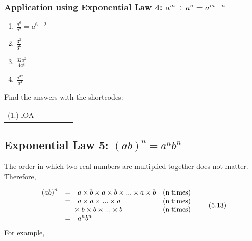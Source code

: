             \subsubsection{ Application using Exponential Law 4: ${a}^{m}÷{a}^{n}={a}^{m-n}$}
            \nopagebreak
        \label{m38359*id65493}\begin{enumerate}[noitemsep, label=\textbf{\arabic*}. ] 
            \label{m38359*uid25}\item 
            $\frac{{a}^{6}}{{a}^{2}}={a}^{6-2}$
      \label{m38359*uid26}\item 
        $\frac{{3}^{2}}{{3}^{6}}$
      \label{m38359*uid27}\item 
        $\frac{32{a}^{2}}{4{a}^{8}}$
      \label{m38359*uid28}\item 
        $\frac{{a}^{3x}}{{a}^{4}}$
\newline
\newline
          \end{enumerate}
      \label{m38359*uid29}
\par {} Find the answers with the shortcodes:
 \par \begin{tabular}[h]{cccccc}
 (1.) lOA  & \end{tabular}
            \subsection{ Exponential Law 5: ${\left(ab\right)}^{n}={a}^{n}{b}^{n}$}
            \nopagebreak
        \label{m38359*id65819}The order in which two real numbers are multiplied together does not matter. Therefore,\par 
        \label{m38359*uid30}\nopagebreak\noindent{}
    \begin{equation}
    \begin{array}{cccc}\hfill {\left(ab\right)}^{n}& =& a\ensuremath{\times}b\ensuremath{\times}a\ensuremath{\times}b\ensuremath{\times}...\ensuremath{\times}a\ensuremath{\times}b\hfill & \left(\mathrm{n\; times}\right)\hfill \\ \hfill & =& a\ensuremath{\times}a\ensuremath{\times}...\ensuremath{\times}a\hfill & \left(\mathrm{n\; times}\right)\hfill \\ \hfill & & \phantom{\rule{-0.166667em}{0ex}}\phantom{\rule{-0.166667em}{0ex}}\phantom{\rule{-0.166667em}{0ex}}\phantom{\rule{-0.166667em}{0ex}}\ensuremath{\times}b\ensuremath{\times}b\ensuremath{\times}...\ensuremath{\times}b\hfill & \left(\mathrm{n\; times}\right)\hfill \\ \hfill & =& {a}^{n}{b}^{n}\hfill & \end{array}\tag{5.13}
      \end{equation}
        \label{m38359*id66030}For example,\par 
        \label{m38359*id66034}\nopagebreak\noindent{}
          
